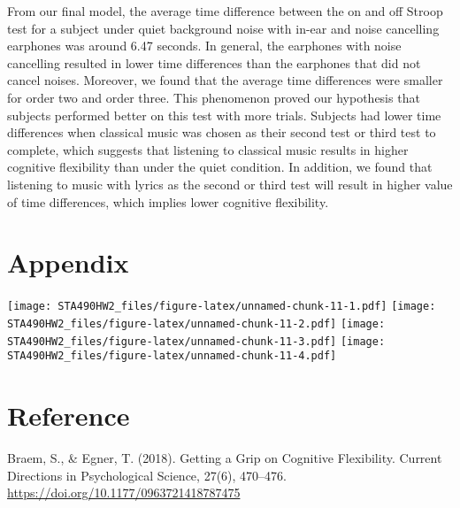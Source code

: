 \documentclass[]{article}
\begin{document}
From our final model, the average time difference between the on and off
Stroop test for a subject under quiet background noise with in-ear and
noise cancelling earphones was around 6.47 seconds. In general, the
earphones with noise cancelling resulted in lower time differences than
the earphones that did not cancel noises. Moreover, we found that the
average time differences were smaller for order two and order three.
This phenomenon proved our hypothesis that subjects performed better on
this test with more trials. Subjects had lower time differences when
classical music was chosen as their second test or third test to
complete, which suggests that listening to classical music results in
higher cognitive flexibility than under the quiet condition. In
addition, we found that listening to music with lyrics as the second or
third test will result in higher value of time differences, which
implies lower cognitive flexibility.

\hypertarget{appendix}{%
\section{Appendix}\label{appendix}}

\texttt{[image: STA490HW2\_files/figure-latex/unnamed-chunk-11-1.pdf]}
\texttt{[image: STA490HW2\_files/figure-latex/unnamed-chunk-11-2.pdf]}
\texttt{[image: STA490HW2\_files/figure-latex/unnamed-chunk-11-3.pdf]}
\texttt{[image: STA490HW2\_files/figure-latex/unnamed-chunk-11-4.pdf]}

\hypertarget{reference}{%
\section{Reference}\label{reference}}

Braem, S., \& Egner, T. (2018). Getting a Grip on Cognitive Flexibility.
Current Directions in Psychological Science, 27(6), 470--476.
\url{https://doi.org/10.1177/0963721418787475}
\end{document}
